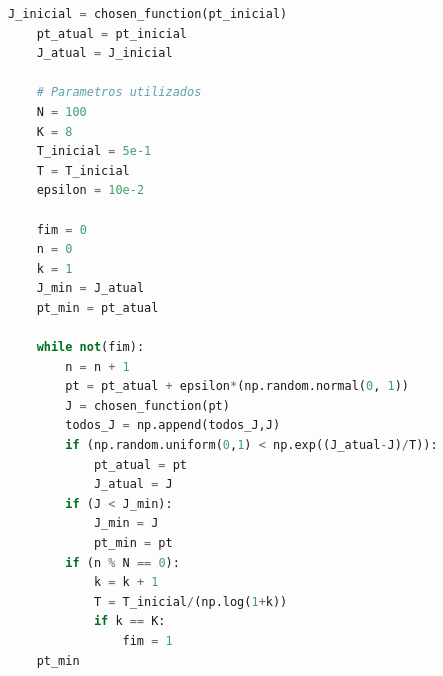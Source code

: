\documentclass{homeworkclass}
\begin{document}
\begin{lstlisting}[language=Python]
	J_inicial = chosen_function(pt_inicial)
	pt_atual = pt_inicial
	J_atual = J_inicial

	# Parametros utilizados
	N = 100
	K = 8
	T_inicial = 5e-1
	T = T_inicial
	epsilon = 10e-2

	fim = 0
	n = 0
	k = 1
	J_min = J_atual
	pt_min = pt_atual

	while not(fim):
		n = n + 1
		pt = pt_atual + epsilon*(np.random.normal(0, 1))
		J = chosen_function(pt)
		todos_J = np.append(todos_J,J)
		if (np.random.uniform(0,1) < np.exp((J_atual-J)/T)):
			pt_atual = pt
			J_atual = J
		if (J < J_min):
			J_min = J
			pt_min = pt
		if (n % N == 0):
			k = k + 1
			T = T_inicial/(np.log(1+k))
			if k == K:
				fim = 1
	pt_min
\end{lstlisting}
\end{document}
